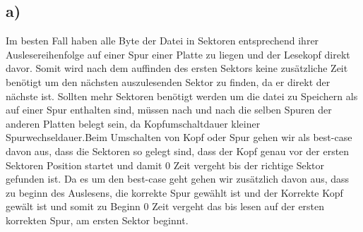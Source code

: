 \documentclass{ti2}
\begin{document}





\subsection*{a)}
Im besten Fall haben alle Byte der Datei in Sektoren entsprechend ihrer Auslesereihenfolge auf einer Spur einer Platte zu liegen und der Lesekopf direkt davor. Somit wird nach dem auffinden des ersten Sektors keine zusätzliche Zeit benötigt um den nächsten auszulesenden Sektor zu finden, da er direkt der nächste ist. Sollten mehr Sektoren benötigt werden um die datei zu Speichern als auf einer Spur enthalten sind, müssen nach und nach die selben Spuren der anderen Platten belegt sein, da Kopfumschaltdauer kleiner Spurwechseldauer.Beim Umschalten von Kopf oder Spur gehen wir als best-case davon aus, dass die Sektoren so gelegt sind, dass der Kopf genau vor der ersten Sektoren Position startet und damit 0 Zeit vergeht bis der richtige Sektor gefunden ist. Da es um den best-case geht gehen wir zusätzlich davon aus, dass zu beginn des Auslesens, die korrekte Spur gewählt ist und der Korrekte Kopf gewält ist und somit zu Beginn 0 Zeit vergeht das bis lesen auf der ersten korrekten Spur, am ersten Sektor beginnt.\\
\end{document}
